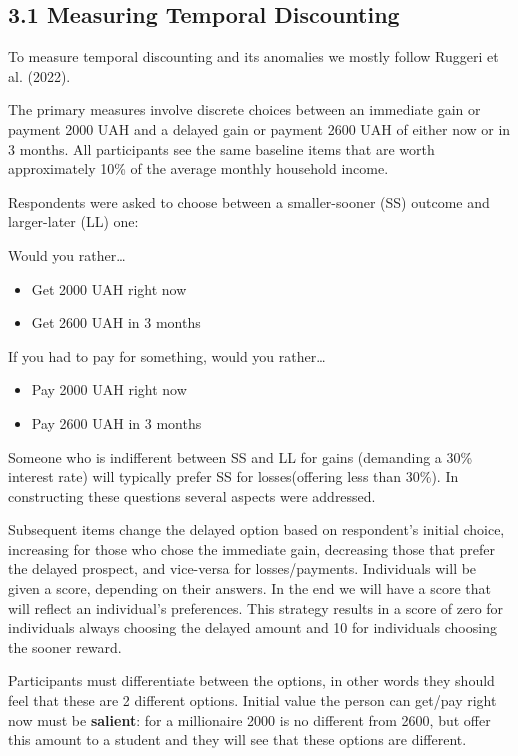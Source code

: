 \documentclass[
  letterpaper,
  DIV=11,
  numbers=noendperiod]{scrartcl}
\begin{document}
\hypertarget{measuring-temporal-discounting}{%
\subsection{3.1 Measuring Temporal
Discounting}\label{measuring-temporal-discounting}}

To measure temporal discounting and its anomalies we mostly follow
Ruggeri et al. (2022).

The primary measures involve discrete choices between an immediate gain
or payment 2000 UAH and a delayed gain or payment 2600 UAH of either now
or in 3 months. All participants see the same baseline items that are
worth approximately 10\% of the average monthly household income.

Respondents were asked to choose between a smaller-sooner (SS) outcome
and larger-later (LL) one:

Would you rather\ldots{}

\begin{itemize}
\item
  Get 2000 UAH right now
\item
  Get 2600 UAH in 3 months
\end{itemize}

If you had to pay for something, would you rather\ldots{}

\begin{itemize}
\item
  Pay 2000 UAH right now
\item
  Pay 2600 UAH in 3 months
\end{itemize}

Someone who is indifferent between SS and LL for gains (demanding a 30\%
interest rate) will typically prefer SS for losses(offering less than
30\%). In constructing these questions several aspects were addressed.

Subsequent items change the delayed option based on respondent's initial
choice, increasing for those who chose the immediate gain, decreasing
those that prefer the delayed prospect, and vice-versa for
losses/payments. Individuals will be given a score, depending on their
answers. In the end we will have a score that will reflect an
individual's preferences. This strategy results in a score of zero for
individuals always choosing the delayed amount and 10 for individuals
choosing the sooner reward.

Participants must differentiate between the options, in other words they
should feel that these are 2 different options. Initial value the person
can get/pay right now must be \textbf{salient}: for a millionaire 2000
is no different from 2600, but offer this amount to a student and they
will see that these options are different.
\end{document}
